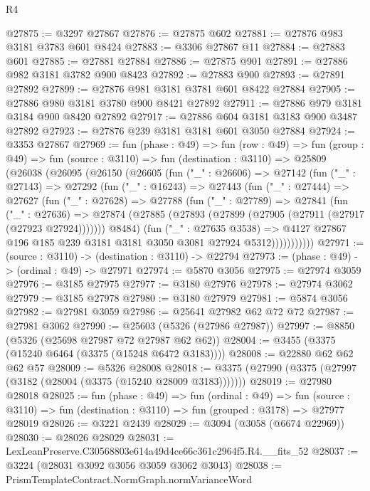 \begin{lexlean}{R4}
\begin{coremodule}
@27875 := @3297 @27867
@27876 := @27875 @602
@27881 := @27876 @983 @3181 @3783 @601 @8424
@27883 := @3306 @27867 @11
@27884 := @27883 @601
@27885 := @27881 @27884
@27886 := @27875 @901
@27891 := @27886 @982 @3181 @3782 @900 @8423
@27892 := @27883 @900
@27893 := @27891 @27892
@27899 := @27876 @981 @3181 @3781 @601 @8422 @27884
@27905 := @27886 @980 @3181 @3780 @900 @8421 @27892
@27911 := @27886 @979 @3181 @3184 @900 @8420 @27892
@27917 := @27886 @604 @3181 @3183 @900 @3487 @27892
@27923 := @27876 @239 @3181 @3181 @601 @3050 @27884
@27924 := @3353 @27867
@27969 := fun (phase : @49) =>
  fun (row : @49) =>
  fun (group : @49) =>
  fun (source : @3110) =>
  fun (destination : @3110) =>
  @25809
    (@26038
      (@26095
        (@26150
          (@26605
            (fun ("_" : @26606) =>
            @27142
              (fun ("_" : @27143) =>
              @27292
                (fun ("_" : @16243) =>
                @27443
                  (fun ("_" : @27444) =>
                  @27627
                    (fun ("_" : @27628) =>
                    @27788
                      (fun ("_" : @27789) =>
                      @27841
                        (fun ("_" : @27636) =>
                        @27874
                          (@27885 (@27893 (@27899 (@27905 (@27911 (@27917 (@27923 @27924)))))))
                          @8484)
                        (fun ("_" : @27635 @3538) =>
                        @4127 @27867 @196 @185 @239 @3181 @3181 @3050 @3081 @27924 @5312)))))))))))
@27971 := (source : @3110) -> (destination : @3110) -> @22794
@27973 := (phase : @49) -> (ordinal : @49) -> @27971
@27974 := @5870 @3056
@27975 := @27974 @3059
@27976 := @3185 @27975
@27977 := @3180 @27976
@27978 := @27974 @3062
@27979 := @3185 @27978
@27980 := @3180 @27979
@27981 := @5874 @3056
@27982 := @27981 @3059
@27986 := @25641 @27982 @62 @72 @72
@27987 := @27981 @3062
@27990 := @25603 (@5326 (@27986 @27987))
@27997 := @8850 (@5326 (@25698 @27987 @72 @27987 @62 @62))
@28004 := @3455 (@3375 (@15240 @6464 (@3375 (@15248 @6472 @3183))))
@28008 := @22880 @62 @62 @62 @57
@28009 := @5326 @28008
@28018 := @3375 (@27990 (@3375 (@27997 (@3182 (@28004 (@3375 (@15240 @28009 @3183)))))))
@28019 := @27980 @28018
@28025 := fun (phase : @49) =>
  fun (ordinal : @49) =>
  fun (source : @3110) => fun (destination : @3110) => fun (grouped : @3178) => @27977 @28019
@28026 := @3221 @2439
@28029 := @3094 (@3058 (@6674 @22969))
@28030 := @28026 @28029
@28031 := LexLeanPreserve.C30568803e614a49d4ce66c361c2964f5.R4.__fits_52
@28037 := @3224 (@28031 @3092 @3056 @3059 @3062 @3043)
@28038 := PrismTemplateContract.NormGraph.normVarianceWord

\end{coremodule}
\end{lexlean}
